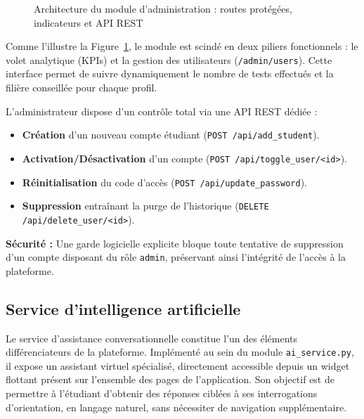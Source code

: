\documentclass[a4paper,12pt]{article}
\begin{document}
\begin{figure}[htbp]
\caption{Architecture du module d'administration : routes protégées, indicateurs et API REST}
\label{fig:admin_architecture}
\vspace{0.3cm}
\end{figure}

Comme l'illustre la Figure~\ref{fig:admin_architecture}, le module est scindé en deux piliers fonctionnels : le volet analytique (KPIs) et la gestion des utilisateurs (\texttt{/admin/users}). Cette interface permet de suivre dynamiquement le nombre de tests effectués et la filière conseillée pour chaque profil.

L'administrateur dispose d'un contrôle total via une API REST dédiée :

{\small
\begin{itemize}[leftmargin=1cm, labelsep=0.2cm, nosep]
    \item \textbf{Création} d'un nouveau compte étudiant (\texttt{POST /api/add\_student}).
    \item \textbf{Activation/Désactivation} d'un compte (\texttt{POST /api/toggle\_user/<id>}).
    \item \textbf{Réinitialisation} du code d'accès (\texttt{POST /api/update\_password}).
    \item \textbf{Suppression} entraînant la purge de l'historique (\texttt{DELETE /api/delete\_user/<id>}).
\end{itemize}
}

\vspace{0.3cm}
\noindent
\begin{infobox}
\textbf{Sécurité :} Une garde logicielle explicite bloque toute tentative de suppression d'un compte disposant du rôle \texttt{admin}, préservant ainsi l'intégrité de l'accès à la plateforme.
\end{infobox}
\subsection{Service d'intelligence artificielle}

Le service d'assistance conversationnelle constitue l'un des éléments différenciateurs
de la plateforme. Implémenté au sein du module \texttt{ai\_service.py}, il expose un
assistant virtuel spécialisé, directement accessible depuis un widget flottant présent
sur l'ensemble des pages de l'application. Son objectif est de permettre à l'étudiant
d'obtenir des réponses ciblées à ses interrogations d'orientation, en langage naturel,
sans nécessiter de navigation supplémentaire.
\end{document}
